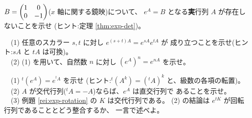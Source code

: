 \begin{mondai}[発展]\label{q:exp-ex10}
$B = \begin{pmatrix}1 & 0 \\ 0 & -1\end{pmatrix}$($x$ 軸に関する鏡映)について、
$e^{A} = B$ となる\textbf{実}行列 $A$ が存在しないことを示せ
(ヒント:定理 \ref{thm:exp-det})。
\end{mondai}

\begin{mondai}[証明]\label{q:exp-ex11}
　(1) 任意のスカラー $s, t$ に対し $e^{(s+t)A} = e^{sA}e^{tA}$ が
成り立つことを示せ(ヒント:$sA$ と $tA$ は可換)。\\
　(2) (1) を用いて、自然数 $n$ に対し $(e^{A})^n = e^{nA}$ を示せ。
\end{mondai}

\begin{mondai}[証明]\label{q:exp-ex12}
　(1) ${}^t(e^{A}) = e^{{}^t\!A}$ を示せ
(ヒント:${}^t(A^k) = ({}^t\!A)^k$ と、級数の各項の転置)。\\
　(2) $A$ が交代行列(${}^t\!A = -A$)ならば、$e^{A}$ は直交行列で
あることを示せ。\\
　(3) 例題 \ref{rei:exp-rotation} の $K$ は交代行列である。
(2) の結論は $e^{tK}$ が回転行列であることとどう整合するか、
一言で述べよ。
\end{mondai}

